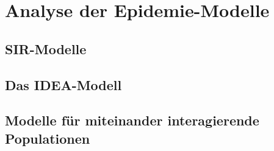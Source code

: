 \section{Analyse der Epidemie-Modelle}
\subsection{SIR-Modelle}

\subsection{Das IDEA-Modell}

\subsection{Modelle für miteinander interagierende Populationen}
